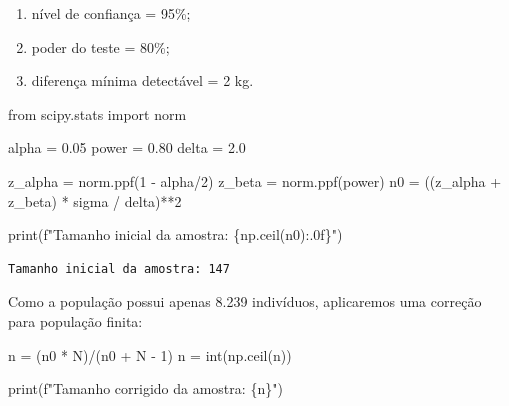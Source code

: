 \documentclass[
  letterpaper,
  DIV=11,
  numbers=noendperiod]{scrreprt}
\newenvironment{Shaded}{\begin{snugshade}}{\end{snugshade}}
\newcommand{\BuiltInTok}[1]{\textcolor[rgb]{0.00,0.23,0.31}{#1}}
\newcommand{\DecValTok}[1]{\textcolor[rgb]{0.68,0.00,0.00}{#1}}
\newcommand{\FloatTok}[1]{\textcolor[rgb]{0.68,0.00,0.00}{#1}}
\newcommand{\ImportTok}[1]{\textcolor[rgb]{0.00,0.46,0.62}{#1}}
\newcommand{\NormalTok}[1]{\textcolor[rgb]{0.00,0.23,0.31}{#1}}
\newcommand{\OperatorTok}[1]{\textcolor[rgb]{0.37,0.37,0.37}{#1}}
\newcommand{\SpecialCharTok}[1]{\textcolor[rgb]{0.37,0.37,0.37}{#1}}
\newcommand{\SpecialStringTok}[1]{\textcolor[rgb]{0.13,0.47,0.30}{#1}}
\providecommand{\tightlist}{%
  \setlength{\itemsep}{0pt}\setlength{\parskip}{0pt}}\usepackage{longtable,booktabs,array}
\begin{document}
\begin{enumerate}
\def\labelenumi{\arabic{enumi}.}
\tightlist
\item
  nível de confiança = 95\%;
\item
  poder do teste = 80\%;
\item
  diferença mínima detectável = 2 kg.
\end{enumerate}

\begin{Shaded}
\begin{Highlighting}[]
\ImportTok{from}\NormalTok{ scipy.stats }\ImportTok{import}\NormalTok{ norm}

\NormalTok{alpha }\OperatorTok{=} \FloatTok{0.05} 
\NormalTok{power }\OperatorTok{=} \FloatTok{0.80} 
\NormalTok{delta }\OperatorTok{=} \FloatTok{2.0} 

\NormalTok{z\_alpha }\OperatorTok{=}\NormalTok{ norm.ppf(}\DecValTok{1} \OperatorTok{{-}}\NormalTok{ alpha}\OperatorTok{/}\DecValTok{2}\NormalTok{) }
\NormalTok{z\_beta }\OperatorTok{=}\NormalTok{ norm.ppf(power) }
\NormalTok{n0 }\OperatorTok{=}\NormalTok{ ((z\_alpha }\OperatorTok{+}\NormalTok{ z\_beta) }\OperatorTok{*}\NormalTok{ sigma }\OperatorTok{/}\NormalTok{ delta)}\OperatorTok{**}\DecValTok{2} 

\BuiltInTok{print}\NormalTok{(}\SpecialStringTok{f"Tamanho inicial da amostra: }\SpecialCharTok{\{}\NormalTok{np}\SpecialCharTok{.}\NormalTok{ceil(n0)}\SpecialCharTok{:.0f\}}\SpecialStringTok{"}\NormalTok{)}
\end{Highlighting}
\end{Shaded}

\begin{verbatim}
Tamanho inicial da amostra: 147
\end{verbatim}

Como a população possui apenas 8.239 indivíduos, aplicaremos uma
correção para população finita:

\begin{Shaded}
\begin{Highlighting}[]
\NormalTok{n }\OperatorTok{=}\NormalTok{ (n0 }\OperatorTok{*}\NormalTok{ N)}\OperatorTok{/}\NormalTok{(n0 }\OperatorTok{+}\NormalTok{ N }\OperatorTok{{-}} \DecValTok{1}\NormalTok{) }
\NormalTok{n }\OperatorTok{=} \BuiltInTok{int}\NormalTok{(np.ceil(n)) }

\BuiltInTok{print}\NormalTok{(}\SpecialStringTok{f"Tamanho corrigido da amostra: }\SpecialCharTok{\{}\NormalTok{n}\SpecialCharTok{\}}\SpecialStringTok{"}\NormalTok{)}
\end{Highlighting}
\end{Shaded}
\end{document}

